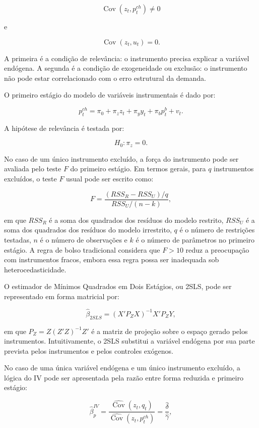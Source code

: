 \documentclass[12pt,a4paper]{article}
\begin{document}
\[
\operatorname{Cov}(z_t,p^{ch}_t)\neq 0
\tag{6}
\label{eq:relevancia}
\]

e

\[
\operatorname{Cov}(z_t,u_t)=0.
\tag{7}
\label{eq:exogeneidade}
\]

A primeira é a condição de relevância: o instrumento precisa explicar a variável endógena. A segunda é a condição de exogeneidade ou exclusão: o instrumento não pode estar correlacionado com o erro estrutural da demanda.

O primeiro estágio do modelo de variáveis instrumentais é dado por:

\[
p^{ch}_t
=
\pi_0 + \pi_z z_t + \pi_y y_t + \pi_b p^b_t + v_t.
\tag{8}
\label{eq:primeiro_estagio}
\]

A hipótese de relevância é testada por:

\[
H_0:\pi_z=0.
\]

No caso de um único instrumento excluído, a força do instrumento pode ser avaliada pelo teste \(F\) do primeiro estágio. Em termos gerais, para \(q\) instrumentos excluídos, o teste \(F\) usual pode ser escrito como:

\[
F
=
\frac{(RSS_R - RSS_U)/q}{RSS_U/(n-k)},
\tag{9}
\label{eq:f_usual}
\]

em que \(RSS_R\) é a soma dos quadrados dos resíduos do modelo restrito, \(RSS_U\) é a soma dos quadrados dos resíduos do modelo irrestrito, \(q\) é o número de restrições testadas, \(n\) é o número de observações e \(k\) é o número de parâmetros no primeiro estágio. A regra de bolso tradicional considera que \(F>10\) reduz a preocupação com instrumentos fracos, embora essa regra possa ser inadequada sob heterocedasticidade.

O estimador de Mínimos Quadrados em Dois Estágios, ou 2SLS, pode ser representado em forma matricial por:

\[
\hat{\beta}_{2SLS}
=
(X'P_ZX)^{-1}X'P_ZY,
\tag{10}
\label{eq:2sls}
\]

em que \(P_Z = Z(Z'Z)^{-1}Z'\) é a matriz de projeção sobre o espaço gerado pelos instrumentos. Intuitivamente, o 2SLS substitui a variável endógena por sua parte prevista pelos instrumentos e pelos controles exógenos.

No caso de uma única variável endógena e um único instrumento excluído, a lógica do IV pode ser apresentada pela razão entre forma reduzida e primeiro estágio:

\[
\hat{\beta}^{IV}_p
=
\frac{\widehat{\operatorname{Cov}}(z_t,q_t)}
{\widehat{\operatorname{Cov}}(z_t,p^{ch}_t)}
=
\frac{\hat{\delta}}{\hat{\gamma}},
\tag{11}
\label{eq:iv_ratio}
\]
\end{document}
